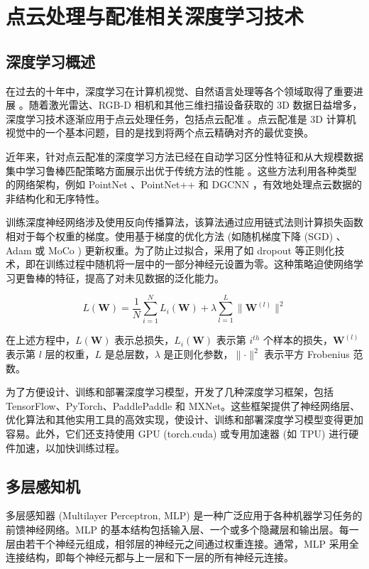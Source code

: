 \section{点云处理与配准相关深度学习技术}

\subsection{深度学习概述}
在过去的十年中，深度学习在计算机视觉、自然语言处理等各个领域取得了重要进展 \cite{lecun2015deep} 。随着激光雷达、RGB-D 相机和其他三维扫描设备获取的 3D 数据日益增多，深度学习技术逐渐应用于点云处理任务，包括点云配准 \cite{wang2019dynamic, choy2020deep} 。点云配准是 3D 计算机视觉中的一个基本问题，目的是找到将两个点云精确对齐的最优变换。

近年来，针对点云配准的深度学习方法已经在自动学习区分性特征和从大规模数据集中学习鲁棒匹配策略方面展示出优于传统方法的性能 \cite{huang2022multiway, lu2019deepvcp} 。这些方法利用各种类型的网络架构，例如 PointNet \cite{qi2017pointnet} 、PointNet++ \cite{qi2017pointnet++} 和 DGCNN \cite{wang2019dynamic} ，有效地处理点云数据的非结构化和无序特性。

训练深度神经网络涉及使用反向传播算法，该算法通过应用链式法则计算损失函数相对于每个权重的梯度。使用基于梯度的优化方法 (如随机梯度下降 (SGD) 、Adam\cite{kingma2014adam} 或 MoCo\cite{he2020momentum} ) 更新权重。为了防止过拟合，采用了如 dropout 等正则化技术，即在训练过程中随机将一层中的一部分神经元设置为零。这种策略迫使网络学习更鲁棒的特征，提高了对未见数据的泛化能力。

\begin{equation}
    L(\boldsymbol{W}) = \frac{1}{N} \sum_{i=1}^{N} L_i(\boldsymbol{W}) + \lambda \sum_{l=1}^{L} \lVert \boldsymbol{W}^{(l)} \rVert^2
\end{equation}

在上述方程中，$L(\boldsymbol{W})$ 表示总损失，$L_i(\boldsymbol{W})$ 表示第 $i^{th}$ 个样本的损失，$\boldsymbol{W}^{(l)}$ 表示第 $l$ 层的权重，$L$ 是总层数，$\lambda$ 是正则化参数，$\lVert \cdot \rVert^2$ 表示平方 Frobenius 范数。

为了方便设计、训练和部署深度学习模型，开发了几种深度学习框架，包括TensorFlow、PyTorch、PaddlePaddle 和 MXNet。这些框架提供了神经网络层、优化算法和其他实用工具的高效实现，使设计、训练和部署深度学习模型变得更加容易。此外，它们还支持使用 GPU  (torch.cuda) 或专用加速器 (如 TPU) 进行硬件加速，以加快训练过程。
\subsection{多层感知机}
多层感知器 (Multilayer Perceptron, MLP) 是一种广泛应用于各种机器学习任务的前馈神经网络\cite{lecun2015deep}。MLP 的基本结构包括输入层、一个或多个隐藏层和输出层。每一层由若干个神经元组成，相邻层的神经元之间通过权重连接。通常，MLP 采用全连接结构，即每个神经元都与上一层和下一层的所有神经元连接。


